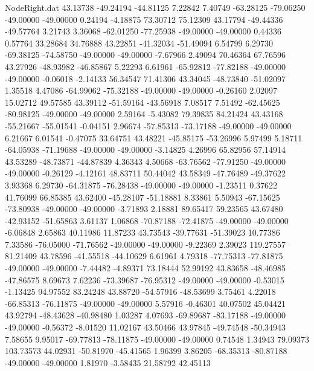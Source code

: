 \begin{filecontents}{NodeRight.dat}
  43.13738  -49.24194  -44.81125     7.22842    7.40749  -63.28125  -79.06250  -49.00000  -49.00000    0.24194   -4.18875   73.30712   75.12309
  43.17794  -49.44336  -49.57764     3.21743    3.36068  -62.01250  -77.25938  -49.00000  -49.00000    0.44336    0.57764   33.28684   34.76888
  43.22851  -41.32034  -51.49094     6.54799    6.29730  -69.38125  -74.58750  -49.00000  -49.00000   -7.67966    2.49094   70.46364   67.76596
  43.27926  -48.93982  -46.85867     5.22293    6.61961  -65.92812  -77.82188  -49.00000  -49.00000   -0.06018   -2.14133   56.34547   71.41306
  43.34045  -48.73840  -51.02097     1.35518    4.47086  -64.99062  -75.32188  -49.00000  -49.00000   -0.26160    2.02097   15.02712   49.57585
  43.39112  -51.59164  -43.56918     7.08517    7.51492  -62.45625  -80.98125  -49.00000  -49.00000    2.59164   -5.43082   79.39835   84.21424
  43.43168  -55.21667  -55.01541    -0.04151    2.96674  -57.85313  -73.17188  -49.00000  -49.00000    6.21667    6.01541   -0.47075   33.64751
  43.48221  -45.85175  -53.26996     5.97499    5.18711  -64.05938  -71.19688  -49.00000  -49.00000   -3.14825    4.26996   65.82956   57.14914
  43.53289  -48.73871  -44.87839     4.36343    4.50668  -63.76562  -77.91250  -49.00000  -49.00000   -0.26129   -4.12161   48.83711   50.44042
  43.58349  -47.76489  -49.37622     3.93368    6.29730  -64.31875  -76.28438  -49.00000  -49.00000   -1.23511    0.37622   41.76099   66.85385
  43.62400  -45.28107  -51.18881     8.33861    5.50943  -67.15625  -73.80938  -49.00000  -49.00000   -3.71893    2.18881   89.65417   59.23565
  43.67480  -42.93152  -51.65863     3.61137    1.06868  -70.87188  -72.41875  -49.00000  -49.00000   -6.06848    2.65863   40.11986   11.87233
  43.73543  -39.77631  -51.39023    10.77386    7.33586  -76.05000  -71.76562  -49.00000  -49.00000   -9.22369    2.39023  119.27557   81.21409
  43.78596  -41.55518  -44.10629     6.61961    4.79318  -77.75313  -77.81875  -49.00000  -49.00000   -7.44482   -4.89371   73.18444   52.99192
  43.83658  -48.46985  -47.86575     8.69673    7.62236  -73.39687  -76.95312  -49.00000  -49.00000   -0.53015   -1.13425   94.97552   83.24248
  43.88720  -54.57916  -48.53699     3.75461    4.22018  -66.85313  -76.11875  -49.00000  -49.00000    5.57916   -0.46301   40.07502   45.04421
  43.92794  -48.43628  -40.98480     1.03287    4.07693  -69.89687  -83.17188  -49.00000  -49.00000   -0.56372   -8.01520   11.02167   43.50466
  43.97845  -49.74548  -50.34943     7.58655    9.95017  -69.77813  -78.11875  -49.00000  -49.00000    0.74548    1.34943   79.09373  103.73573
  44.02931  -50.81970  -45.41565     1.96399    3.86205  -68.35313  -80.87188  -49.00000  -49.00000    1.81970   -3.58435   21.58792   42.45113

\end{filecontents}
